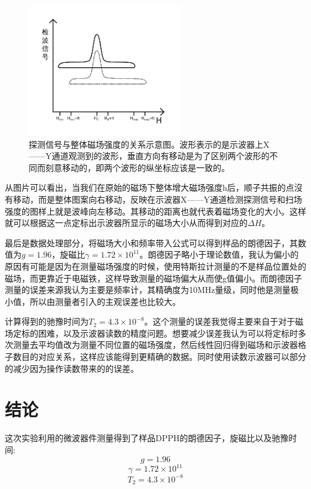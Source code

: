 \documentclass[aps,pre,12pt,preprint,onecolumn,showpacs,showkeys,UTF8]{article}
\begin{document}
\begin{figure}[h]
	\begin{center}
		\includegraphics[width=0.6\textwidth]{pic7.png}
	\end{center}
\caption{\label{fig:exp4}探测信号与整体磁场强度的关系示意图。波形表示的是示波器上X——Y通道观测到的波形，垂直方向有移动是为了区别两个波形的不同而刻意移动的，即两个波形的纵坐标应该是一致的。}
\end{figure}

从图片可以看出，当我们在原始的磁场下整体增大磁场强度h后，顺子共振的点沒有移动，而是整体图案向右移动，反映在示波器X——Y通道检测探测信号和扫场强度的图样上就是波峰向左移动。其移动的距离也就代表着磁场变化的大小。这样就可以根据这一点定标出示波器所显示的磁场大小从而得到对应的$\Delta H$。

最后是数据处理部分，将磁场大小和频率带入公式可以得到样品的朗德因子，其数值为$g=1.96$，旋磁比$\gamma=1.72\times 10^{11}$。朗德因子略小于理论数值，我认为偏小的原因有可能是因为在测量磁场强度的时候，使用特斯拉计测量的不是样品位置处的磁场，而更靠近于电磁铁，这样导致测量的磁场偏大从而使g值偏小。而朗德因子测量的误差来源我认为主要是频率计，其精确度为10MHz量级，同时他是测量极小值，所以由测量者引入的主观误差也比较大。

计算得到的驰豫时间为$T_2=4.3\times 10^{-8}$。这个测量的误差我觉得主要来自于对于磁场定标的困难，以及示波器读数的精度问题。想要减少误差我认为可以将定标时多次测量去平均值改为测量不同位置的磁场强度，然后线性回归得到磁场和示波器格子数目的对应关系，这样应该能得到更精确的数据。同时使用读数示波器可以部分的减少因为操作读数带来的的误差。

\section{结论}

这次实验利用的微波器件测量得到了样品DPPH的朗德因子，旋磁比以及驰豫时间:
$$g=1.96$$
$$\gamma=1.72\times 10^{11}$$
$$T_2=4.3\times 10^{-8}$$
\end{document}
